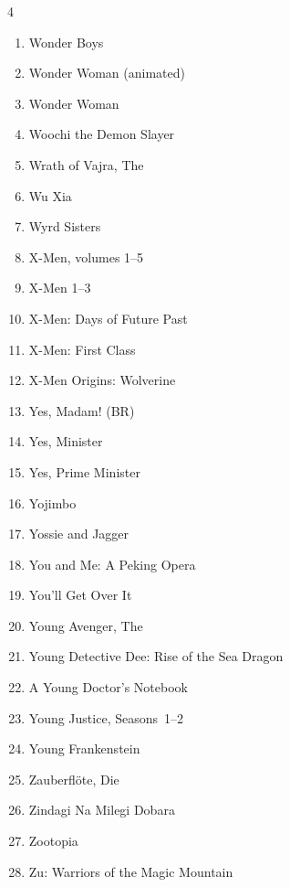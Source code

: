 \documentclass{article}
\begin{document}
\begin{multicols}{4}
\begin{enumerate}
\item Wonder Boys
\item Wonder Woman (animated)
\item Wonder Woman
\item Woochi the Demon Slayer
\item Wrath of Vajra, The
\item Wu Xia
\item Wyrd Sisters
\item X-Men, volumes 1--5
\item X-Men 1--3
\item X-Men: Days of Future Past
\item X-Men: First Class
\item X-Men Origins: Wolverine
\item Yes, Madam! (BR)
\item Yes, Minister
\item Yes, Prime Minister
\item Yojimbo
\item Yossie and Jagger
\item You and Me: A Peking Opera
\item You'll Get Over It
\item Young Avenger, The
\item Young Detective Dee: Rise of the Sea Dragon
\item A Young Doctor's Notebook
\item Young Justice, Seasons~1--2
\item Young Frankenstein
\item Zauberfl\"ote, Die
\item Zindagi Na Milegi Dobara
\item Zootopia
\item Zu: Warriors of the Magic Mountain

\end{enumerate}

\end{multicols}
\end{document}
